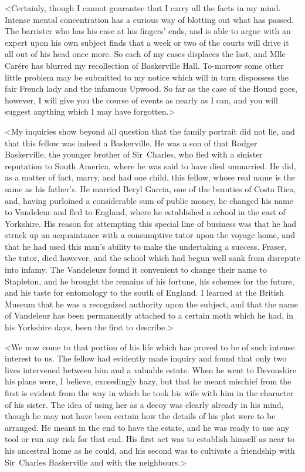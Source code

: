 <Certainly, though I cannot guarantee that I carry all the facts in my mind. Intense mental concentration has a curious way of blotting out what has passed. The barrister who has his case at his fingers' ends, and is able to argue with an expert upon his own subject finds that a week or two of the courts will drive it all out of his head once more. So each of my cases displaces the last, and Mlle Carére has blurred my recollection of Baskerville Hall. To-morrow some other little problem may be submitted to my notice which will in turn dispossess the fair French lady and the infamous Upwood. So far as the case of the Hound goes, however, I will give you the course of events as nearly as I can, and you will suggest anything which I may have forgotten.>



<My inquiries show beyond all question that the family portrait did not lie, and that this fellow was indeed a Baskerville. He was a son of that Rodger Baskerville, the younger brother of Sir~Charles, who fled with a sinister reputation to South America, where he was said to have died unmarried. He did, as a matter of fact, marry, and had one child, this fellow, whose real name is the same as his father's. He married Beryl Garcia, one of the beauties of Costa Rica, and, having purloined a considerable sum of public money, he changed his name to Vandeleur and fled to England, where he established a school in the east of Yorkshire. His reason for attempting this special line of business was that he had struck up an acquaintance with a consumptive tutor upon the voyage home, and that he had used this man's ability to make the undertaking a success. Fraser, the tutor, died however, and the school which had begun well sank from disrepute into infamy. The Vandeleurs found it convenient to change their name to Stapleton, and he brought the remains of his fortune, his schemes for the future, and his taste for entomology to the south of England. I learned at the British Museum that he was a recognized authority upon the subject, and that the name of Vandeleur has been permanently attached to a certain moth which he had, in his Yorkshire days, been the first to describe.>

<We now come to that portion of his life which has proved to be of such intense interest to us. The fellow had evidently made inquiry and found that only two lives intervened between him and a valuable estate. When he went to Devonshire his plans were, I believe, exceedingly hazy, but that he meant mischief from the first is evident from the way in which he took his wife with him in the character of his sister. The idea of using her as a decoy was clearly already in his mind, though he may not have been certain how the details of his plot were to be arranged. He meant in the end to have the estate, and he was ready to use any tool or run any risk for that end. His first act was to establish himself as near to his ancestral home as he could, and his second was to cultivate a friendship with Sir~Charles Baskerville and with the neighbours.>

